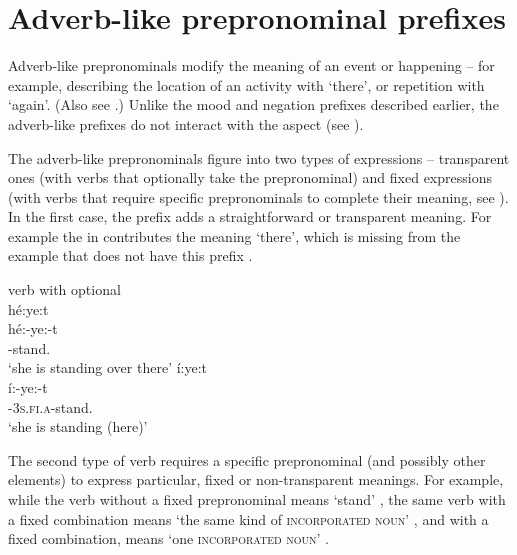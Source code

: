 \largerpage
\section{Adverb-like prepronominal prefixes} \label{Adverb-like prepronominal prefixes}
Adverb-like prepronominals modify the meaning of an event or happening -- for example, describing the location of an activity with  {\cislocative} ‘there’, or repetition with  {\repetitive} ‘again’. (Also see .) Unlike the mood and negation prefixes described earlier, the adverb-like prefixes do not interact with the  {\punctual} aspect (see ).  


The adverb-like prepronominals figure into two types of expressions -- transparent ones (with verbs that optionally take the prepronominal) and fixed expressions (with verbs that require specific prepronominals to complete their meaning, see ). In the first case, the prefix adds a straightforward or transparent meaning. For example the  \textsc{\translocative} in  contributes the meaning ‘there’, which is missing from the example that does not have this prefix .
 
\ea\label{ex:advlike1} verb with optional  \textsc{\translocative}\\
\ea hé:ye:t\\\label{ex:advlike1a}
\gll hé:-ye:-t\\
-stand.{\stative}\\
\glt `she is standing over there'
\ex\label{ex:advlike1b}
í:ye:t \\
  \gll í:-ye:-t\\
  {\prothetic}-\textsc{3s.fi.a}-stand.{\stative}\\
  \glt `she is standing (here)'
\z
\z 


The second type of verb requires a specific prepronominal (and possibly other elements) to express particular, fixed or non-transparent meanings. For example, while the verb  without a fixed prepronominal means ‘stand’ , the same verb with a fixed  combination means ‘the same kind of \textsc{incorporated noun}’ , and with a fixed  combination, means ‘one \textsc{incorporated noun}’ . 

